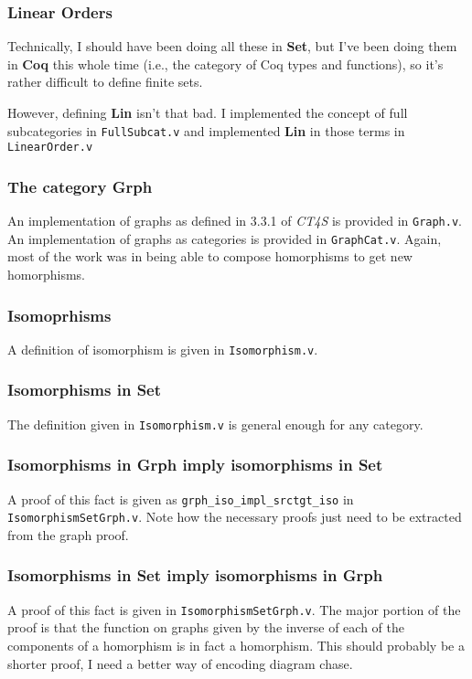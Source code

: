 \documentclass[12pt,twocolumn,oneside]{book}
\begin{document}
\subsubsection{Linear Orders}

Technically, I should have been doing all these in \textbf{Set}, but I've been
doing them in \textbf{Coq} this whole time (i.e., the category of Coq
types and functions), so it's rather difficult to define finite sets.

However, defining \textbf{Lin} isn't that bad. I implemented the concept of full
subcategories in \texttt{FullSubcat.v} and implemented \textbf{Lin} in those terms
in \texttt{LinearOrder.v}

\subsubsection{The category \textbf{Grph}}

An implementation of graphs as defined in 3.3.1 of \emph{CT4S} is provided in
\texttt{Graph.v}. An implementation of graphs as categories is provided in
\texttt{GraphCat.v}. Again, most of the work was in being able to compose homorphisms
to get new homorphisms.

\subsubsection{Isomoprhisms}

A definition of isomorphism is given in \texttt{Isomorphism.v}.

\subsubsection{Isomorphisms in \textbf{Set}}

The definition given in \texttt{Isomorphism.v} is general enough for any category.

\subsubsection{Isomorphisms in \textbf{Grph} imply isomorphisms in \textbf{Set}}

A proof of this fact is given as \texttt{grph\_iso\_impl\_srctgt\_iso} in \texttt{IsomorphismSetGrph.v}.
Note how the necessary proofs just need to be extracted from the graph proof.

\subsubsection{Isomorphisms in \textbf{Set} imply isomorphisms in \textbf{Grph}}

A proof of this fact is given in \texttt{IsomorphismSetGrph.v}. The major portion of the
proof is that the function on graphs given by the inverse of each of the components
of a homorphism is in fact a homorphism. This should probably be a shorter proof,
I need a better way of encoding diagram chase.
\end{document}
